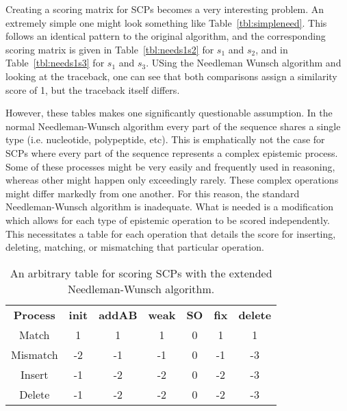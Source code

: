 
Creating a scoring matrix for SCPs becomes a very interesting problem. An extremely simple one might look something like Table~\ref{tbl:simpleneed}. This follows an identical pattern to the original algorithm, and the corresponding scoring matrix is given in Table~\ref{tbl:needs1s2} for $s_1$ and $s_2$, and in Table~\ref{tbl:needs1s3} for $s_1$ and $s_3$. USing the Needleman Wunsch algorithm and looking at the traceback, one can see that both comparisons assign a similarity score of 1, but the traceback itself differs.

However, these tables makes one significantly questionable assumption. In the normal Needleman-Wunsch algorithm every part of the sequence shares a single type (i.e. nucleotide, polypeptide, etc). This is emphatically not the case for SCPs where every part of the sequence represents a complex epistemic process. Some of these processes might be very easily and frequently used in reasoning, whereas other might happen only exceedingly rarely. These complex operations might differ markedly from one another. For this reason, the standard Needleman-Wunsch algorithm is inadequate. What is needed is a modification which allows for each type of epistemic operation to be scored independently. This necessitates a table for each operation that details the score for inserting, deleting, matching, or mismatching that particular operation.


\begin{table}
\begin{center}

\begin{tabular}{ c c c c c c c}
 \textbf{Process} & \textbf{init} & \textbf{addAB} & \textbf{weak} & \textbf{SO} & \textbf{fix} & \textbf{delete}\\ 
 Match & 1 & 1 & 1 & 0 & 1 & 1\\
 Mismatch & -2 & -1 & -1 & 0 & -1 & -3\\
 Insert & -1 & -2 & -2 & 0 & -2 & -3\\
 Delete & -1 & -2 & -2 & 0 & -2 & -3
\end{tabular}
\caption{An arbitrary table for scoring SCPs with the extended Needleman-Wunsch algorithm.}
\label{tbl:arbneed}

\end{center}
\end{table}



